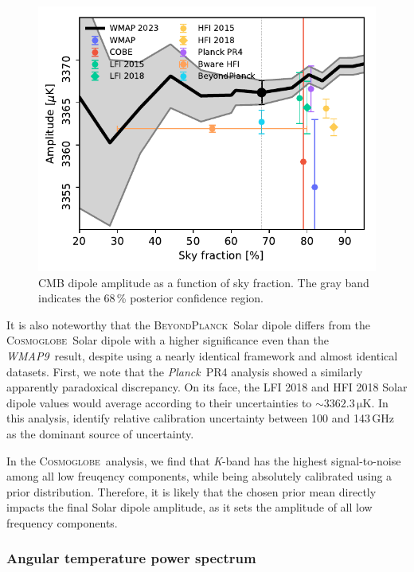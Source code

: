 \documentclass[twocolumn]{../../common/aa}
\def\WMAPnine{\emph{WMAP9}}
\def\Planck{\emph{Planck}}
\newcommand{\bp}{\textsc{BeyondPlanck}}
\newcommand{\cosmoglobe}{\textsc{Cosmoglobe}}
\newcommand{\K}[0]{\textit K}
\begin{document}
\begin{figure}
	\includegraphics[width=\columnwidth]{figures/dip_amplitude.pdf}
	\caption{CMB dipole amplitude as a function of sky fraction. The gray band indicates the 68\,\% posterior confidence region.}
	\label{fig:dip_amp}
\end{figure}

It is also noteworthy that the \bp\ Solar dipole differs from the \cosmoglobe\ Solar dipole with a higher significance even than the \WMAPnine\ result, despite using a nearly identical framework and almost identical datasets. First, we note that the \Planck\ PR4 analysis \citep{npipe} showed a similarly apparently paradoxical discrepancy. On its face, the LFI 2018 and HFI 2018 Solar dipole values would average according to their uncertainties to $\sim3362.3\,\mathrm{\mu K}$. In this analysis, \citet{npipe} identify relative calibration uncertainty between 100 and 143\,GHz as the dominant source of uncertainty.

In the \cosmoglobe\ analysis, we find that \K-band has the highest signal-to-noise among all low freuqency components, while being absolutely calibrated using a prior distribution. Therefore, it is likely that the chosen prior mean directly impacts the final Solar dipole amplitude, as it sets the amplitude of all low frequency components. 





\subsubsection{Angular temperature power spectrum}
\label{sec:cls}
\end{document}
